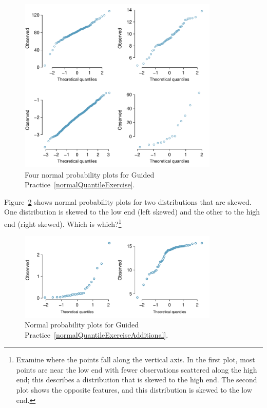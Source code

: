 \begin{figure}
\centering
\includegraphics[width=0.85\textwidth]{02/figures/normalQuantileExer/normalQuantileExer}
\caption{Four normal probability plots for Guided Practice~\ref{normalQuantileExercise}.}
\label{normalQuantileExer}
\end{figure}

\begin{exercise} \label{normalQuantileExerciseAdditional}
Figure~\ref{normalQuantileExerAdditional} shows normal probability plots for two distributions that are skewed. One distribution is skewed to the low end (left skewed) and the other to the high end (right skewed). Which is which?\footnote{Examine where the points fall along the vertical axis. In the first plot, most points are near the low end with fewer observations scattered along the high end; this describes a distribution that is skewed to the high end. The second plot shows the opposite features, and this distribution is skewed to the low end.}
\end{exercise}

\begin{figure}
\centering
\includegraphics[width=0.85\textwidth]{02/figures/normalQuantileExer/normalQuantileExerAdditional}
\caption{Normal probability plots for Guided Practice~\ref{normalQuantileExerciseAdditional}.}
\label{normalQuantileExerAdditional}
\end{figure}


